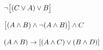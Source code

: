 \begin{compactlist}
\item $\neg\bigl[(C\vee A) \vee B\bigr]$\vspace{.5ex} 						
%
%
%

\item $\bigl[(A\wedge B) \wedge\neg(A\wedge B)\bigr] \wedge C$ \vspace{.5ex}	
%
%
%
%
%
\item $(A \wedge B) \rightarrow[(A \wedge C) \vee (B \wedge D)]$ \vspace{.5ex}		
%
%
%
\end{compactlist}

